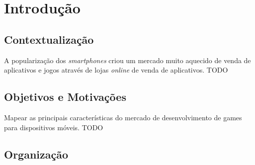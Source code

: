 
\chapter{Introdução}
\label{cap:introducao}


\section{Contextualização}

A popularização dos \emph{smartphones} criou um mercado muito aquecido de venda de aplicativos e jogos através de lojas \emph{online} de venda de aplicativos. TODO




\section{Objetivos e Motivações}


Mapear as principais características do mercado de desenvolvimento de games para dispositivos móveis. TODO
 


\section{Organização}



